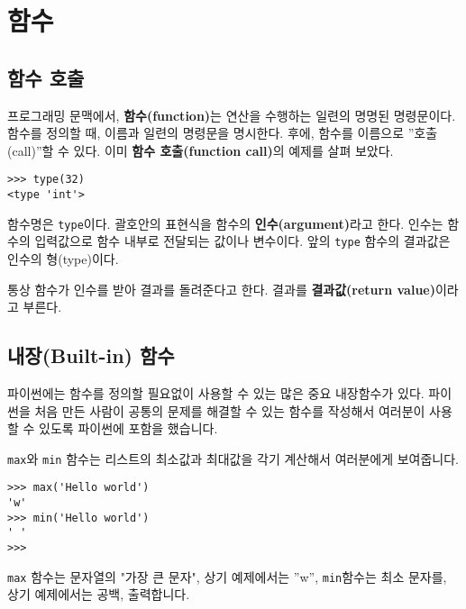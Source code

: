 
\chapter{함수}
\label{funcchap}

\section{함수 호출}
\label{functionchap}

프로그래밍 문맥에서, {\bf 함수(function)}는 연산을 수행하는 일련의 명명된 명령문이다. 
함수를 정의할 때, 이름과 일련의 명령문을 명시한다. 후에, 함수를 이름으로 ''호출(call)''할 수 있다.
이미 {\bf 함수 호출(function call)}의 예제를 살펴 보았다.  

\beforeverb
\begin{verbatim}
>>> type(32)
<type 'int'>
\end{verbatim}
\afterverb
%
함수명은 {\tt type}이다. 괄호안의 표현식을 함수의 {\bf 인수(argument)}라고 한다. 
인수는 함수의 입력값으로 함수 내부로 전달되는 값이나 변수이다. 앞의 {\tt type} 함수의 결과값은 인수의 형(type)이다.


통상 함수가 인수를 받아 결과를 돌려준다고 한다. 결과를 {\bf 결과값(return value)}이라고 부른다.


\section{내장(Built-in) 함수}

파이썬에는 함수를 정의할 필요없이 사용할 수 있는 많은 중요 내장함수가 있다.
파이썬을 처음 만든 사람이 공통의 문제를 해결할 수 있는 함수를 작성해서 여러분이 사용할 수 있도록 파이썬에 포함을 했습니다.

{\tt max}와 {\tt min} 함수는 리스트의 최소값과 최대값을 각기 계산해서 여러분에게 보여줍니다.

\beforeverb
\begin{verbatim}
>>> max('Hello world')
'w'
>>> min('Hello world')
' '
>>>
\end{verbatim}
\afterverb
%
{\tt max} 함수는 문자열의 "가장 큰 문자", 상기 예제에서는 ''w'', 
{\tt min}함수는 최소 문자를, 상기 예제에서는 공백, 출력합니다.

